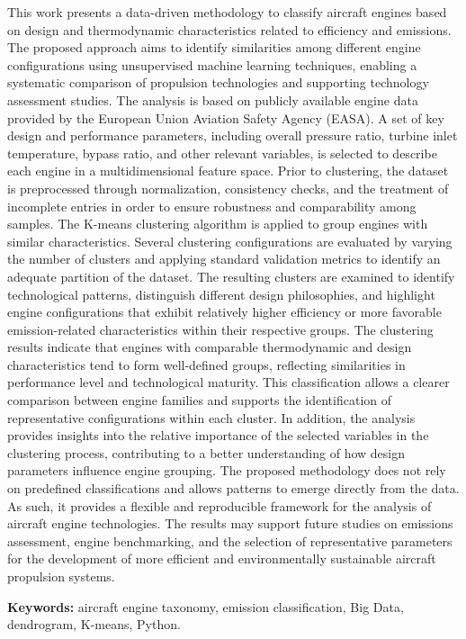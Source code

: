 \documentclass[12pt]{article} %
\begin{document}
	
	\begin{englishabstract}
		\noindent
		
                This work presents a data-driven methodology to classify aircraft engines based on design and thermodynamic characteristics related to efficiency and emissions. The proposed approach aims to identify similarities among different engine configurations using unsupervised machine learning techniques, enabling a systematic comparison of propulsion technologies and supporting technology assessment studies. The analysis is based on publicly available engine data provided by the European Union Aviation Safety Agency (EASA). A set of key design and performance parameters, including overall pressure ratio, turbine inlet temperature, bypass ratio, and other relevant variables, is selected to describe each engine in a multidimensional feature space. Prior to clustering, the dataset is preprocessed through normalization, consistency checks, and the treatment of incomplete entries in order to ensure robustness and comparability among samples. The K-means clustering algorithm is applied to group engines with similar characteristics. Several clustering configurations are evaluated by varying the number of clusters and applying standard validation metrics to identify an adequate partition of the dataset. The resulting clusters are examined to identify technological patterns, distinguish different design philosophies, and highlight engine configurations that exhibit relatively higher efficiency or more favorable emission-related characteristics within their respective groups. The clustering results indicate that engines with comparable thermodynamic and design characteristics tend to form well-defined groups, reflecting similarities in performance level and technological maturity. This classification allows a clearer comparison between engine families and supports the identification of representative configurations within each cluster. In addition, the analysis provides insights into the relative importance of the selected variables in the clustering process, contributing to a better understanding of how design parameters influence engine grouping. The proposed methodology does not rely on predefined classifications and allows patterns to emerge directly from the data. As such, it provides a flexible and reproducible framework for the analysis of aircraft engine technologies. The results may support future studies on emissions assessment, engine benchmarking, and the selection of representative parameters for the development of more efficient and environmentally sustainable aircraft propulsion systems.
	\end{englishabstract}
	
    \textbf{Keywords:} aircraft engine taxonomy, emission classification, Big Data, dendrogram, K-means, Python.
	
\end{document}
